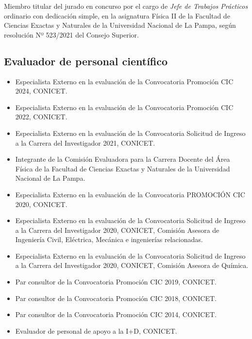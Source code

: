  Miembro titular del jurado en concurso por el cargo de \textit{Jefe de Trabajos Prácticos} ordinario con dedicación simple, en la asignatura Física II de la Facultad de Ciencias Exactas y Naturales de la Universidad Nacional de La Pampa, según resolución Nº 523/2021 del Consejo Superior.


\subsection{Evaluador de personal científico}

\begin{itemize} \setlength\itemsep{-0.25em}
    \item {} Especialista Externo en la evaluación de la Convocatoria Promoción CIC 2024, CONICET.
    \item {} Especialista Externo en la evaluación de la Convocatoria Promoción CIC 2022, CONICET.
    \item {} Especialista Externo en la evaluación de la Convocatoria Solicitud de Ingreso a la Carrera del Investigador 2021, CONICET.
    \item {} Integrante de la Comisión Evaluadora para la Carrera Docente del Área Física de la Facultad de Ciencias Exactas y Naturales de la Universidad Nacional de La Pampa.
    \item Especialista Externo en la evaluación de la Convocatoria PROMOCIÓN CIC 2020, CONICET.
    \item {} Especialista Externo en la evaluación de la Convocatoria Solicitud de Ingreso a la Carrera del Investigador 2020, CONICET, Comisión Asesora de Ingeniería Civil, Eléctrica, Mecánica e ingenierías relacionadas.
    \item Especialista Externo en la evaluación de la Convocatoria Solicitud de Ingreso a la Carrera del Investigador 2020, CONICET, Comisión Asesora de Química.
    \item {} Par consultor de la Convocatoria Promoción CIC 2019, CONICET.
    \item {} Par consultor de la Convocatoria Promoción CIC 2018, CONICET.
    \item {} Par consultor de la Convocatoria Promoción CIC 2014, CONICET.
    \item {} Evaluador de personal de apoyo a la I+D, CONICET.
\end{itemize}

